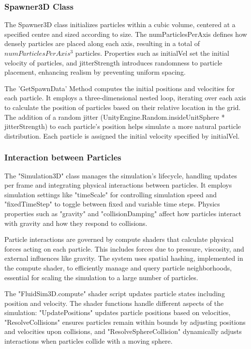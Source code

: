 \documentclass{article}
\begin{document}
\subsubsection{Spawner3D Class}
 \hspace{1em} The Spawner3D class initializes particles within a cubic volume, centered at a specified centre and sized according to size. The numParticlesPerAxis defines how densely particles are placed along each axis, resulting in a total of $numParticlesPerAxis^3$ particles. Properties such as initialVel set the initial velocity of particles, and jitterStrength introduces randomness to particle placement, enhancing realism by preventing uniform spacing.

 The 'GetSpawnData' Method computes the initial positions and velocities for each particle. It employs a three-dimensional nested loop, iterating over each axis to calculate the position of particles based on their relative location in the grid. The addition of a random jitter (UnityEngine.Random.insideUnitSphere * jitterStrength) to each particle's position helps simulate a more natural particle distribution. Each particle is assigned the initial velocity specified by initialVel.

\subsubsection{Interaction between Particles}
 \hspace{1em} The "Simulation3D" class manages the simulation's lifecycle, handling updates per frame and integrating physical interactions between particles. It employs simulation settings like "timeScale" for controlling simulation speed and "fixedTimeStep" to toggle between fixed and variable time steps. Physics properties such as "gravity" and "collisionDamping" affect how particles interact with gravity and how they respond to collisions.

 Particle interactions are governed by compute shaders that calculate physical forces acting on each particle. This includes forces due to pressure, viscosity, and external influences like gravity. The system uses spatial hashing, implemented in the compute shader, to efficiently manage and query particle neighborhoods, essential for scaling the simulation to a large number of particles.

 The "FluidSim3D.compute" shader script updates particle states including position and velocity. The shader functions handle different aspects of the simulation: "UpdatePositions" updates particle positions based on velocities, "ResolveCollisions" ensures particles remain within bounds by adjusting positions and velocities upon collisions, and "ResolveSphereCollision" dynamically adjusts interactions when particles collide with a moving sphere.
\end{document}
